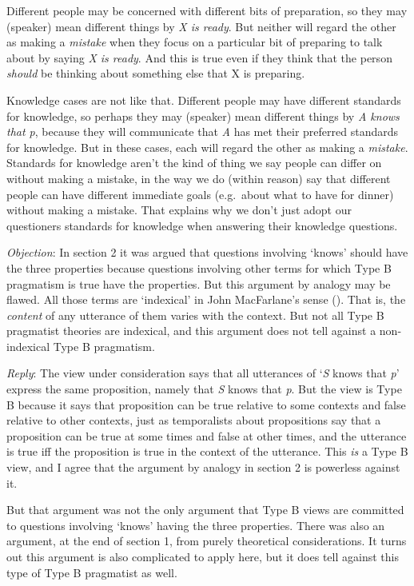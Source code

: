 \documentclass[
  10pt,
  letterpaper,
  DIV=11,
  numbers=noendperiod,
  twoside]{scrartcl}
\begin{document}
Different people may be concerned with different bits of preparation, so
they may (speaker) mean different things by \emph{X is ready}. But
neither will regard the other as making a \emph{mistake} when they focus
on a particular bit of preparing to talk about by saying \emph{X is
ready}. And this is true even if they think that the person
\emph{should} be thinking about something else that X is preparing.

Knowledge cases are not like that. Different people may have different
standards for knowledge, so perhaps they may (speaker) mean different
things by \emph{A knows that p}, because they will communicate that
\emph{A} has met their preferred standards for knowledge. But in these
cases, each will regard the other as making a \emph{mistake}. Standards
for knowledge aren't the kind of thing we say people can differ on
without making a mistake, in the way we do (within reason) say that
different people can have different immediate goals (e.g.~about what to
have for dinner) without making a mistake. That explains why we don't
just adopt our questioners standards for knowledge when answering their
knowledge questions.

\emph{Objection}: In section 2 it was argued that questions involving
`knows' should have the three properties because questions involving
other terms for which Type B pragmatism is true have the properties. But
this argument by analogy may be flawed. All those terms are `indexical'
in John MacFarlane's sense
(). That is, the
\emph{content} of any utterance of them varies with the context. But not
all Type B pragmatist theories are indexical, and this argument does not
tell against a non-indexical Type B pragmatism.

\emph{Reply}: The view under consideration says that all utterances of
`\emph{S} knows that \emph{p}' express the same proposition, namely that
\emph{S} knows that \emph{p}. But the view is Type B because it says
that proposition can be true relative to some contexts and false
relative to other contexts, just as temporalists about propositions say
that a proposition can be true at some times and false at other times,
and the utterance is true iff the proposition is true in the context of
the utterance. This \emph{is} a Type B view, and I agree that the
argument by analogy in section 2 is powerless against it.

But that argument was not the only argument that Type B views are
committed to questions involving `knows' having the three properties.
There was also an argument, at the end of section 1, from purely
theoretical considerations. It turns out this argument is also
complicated to apply here, but it does tell against this type of Type B
pragmatist as well.
\end{document}

